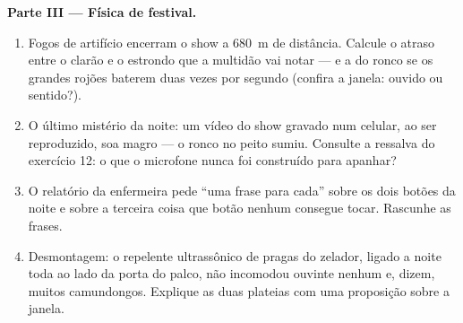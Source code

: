 \begin{problem}
\medskip\noindent\textbf{Parte III --- Física de festival.}
\begin{enumerate}[resume]
  \item Fogos de artifício encerram o show a \qty{680}{m} de
        distância. Calcule o atraso entre o clarão e o estrondo que a
        multidão vai notar --- e a  do ronco se os grandes
        rojões baterem duas vezes por segundo (confira a janela:
        ouvido ou sentido?).
  \item O último mistério da noite: um vídeo do show gravado num
        celular, ao ser reproduzido, soa magro --- o ronco no peito
        sumiu. Consulte a ressalva do exercício 12: o que o microfone
        nunca foi construído para apanhar?
  \item O relatório da enfermeira pede ``uma frase para cada'' sobre
        os dois botões da noite e sobre a terceira coisa que botão
        nenhum consegue tocar. Rascunhe as frases.
  \item Desmontagem: o repelente ultrassônico de pragas do zelador,
        ligado a noite toda ao lado da porta do palco, não incomodou
        ouvinte nenhum e, dizem, muitos camundongos. Explique as duas
        plateias com uma proposição sobre a janela.
\end{enumerate}
\end{problem}
